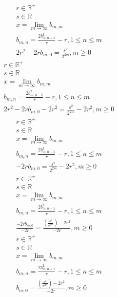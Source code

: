 \documentclass[a4paper,12pt]{report}
\begin{document}
\begin{subequations}
\begin{gather}
r \in \mathbb{R}^+ \\
s \in \mathbb{R} \\
x = \lim \limits_{m \to \infty} b_{m,m} \\
b_{m,n} = \frac{2b_{m,n-1}^2}{r} - r, 1 \leq n \leq m \\
2r^2 - 2rb_{m,0} = \frac{s^2}{2^{2m}}, m \geq 0
\end{gather}
\end{subequations}
\begin{subequations}
\begin{gather}
r \in \mathbb{R}^+ \\
s \in \mathbb{R} \\
x = \lim \limits_{m \to \infty} b_{m,m} \\
b_{m,n} = \frac{2b_{m,n-1}^2}{r} - r, 1 \leq n \leq m \\
2r^2 - 2rb_{m,0} - 2r^2 = \frac{s^2}{2^{2m}} - 2r^2, m \geq 0
\end{gather}
\end{subequations}
\begin{subequations}
\begin{gather}
r \in \mathbb{R}^+ \\
s \in \mathbb{R} \\
x = \lim \limits_{m \to \infty} b_{m,m} \\
b_{m,n} = \frac{2b_{m,n-1}^2}{r} - r, 1 \leq n \leq m \\
-2rb_{m,0} = \frac{s^2}{2^{2m}} - 2r^2, m \geq 0
\end{gather}
\end{subequations}
\begin{subequations}
\begin{gather}
r \in \mathbb{R}^+ \\
s \in \mathbb{R} \\
x = \lim \limits_{m \to \infty} b_{m,m} \\
b_{m,n} = \frac{2b_{m,n-1}^2}{r} - r, 1 \leq n \leq m \\
\frac{-2rb_{m,0}}{-2r} = \frac{\left(\frac{s^2}{2^{2m}}\right) - 2r^2}{-2r}, m \geq 0
\end{gather}
\end{subequations}
\begin{subequations}
\begin{gather}
r \in \mathbb{R}^+ \\
s \in \mathbb{R} \\
x = \lim \limits_{m \to \infty} b_{m,m} \\
b_{m,n} = \frac{2b_{m,n-1}^2}{r} - r, 1 \leq n \leq m \\
b_{m,0} = \frac{\left(\frac{s^2}{2^{2m}}\right) - 2r^2}{-2r}, m \geq 0
\end{gather}
\end{subequations}
\end{document}

